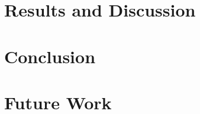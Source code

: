\documentclass[11pt,a4paper]{report}
\begin{document}
\chapter{Results and Discussion}


\chapter{Conclusion}


\chapter{Future Work}

\newpage

\appendix

\end{document}
